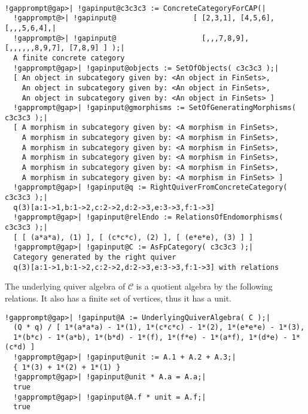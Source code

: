 \begin{computation}\phantom{}\\
\begin{Verbatim}[commandchars=!@|,fontsize=\small,frame=single,label=Example]
  !gapprompt@gap>| !gapinput@c3c3c3 := ConcreteCategoryForCAP(|
  !gapprompt@>| !gapinput@                  [ [2,3,1], [4,5,6], [,,,5,6,4],|
  !gapprompt@>| !gapinput@                    [,,,7,8,9], [,,,,,,8,9,7], [7,8,9] ] );|
  A finite concrete category
  !gapprompt@gap>| !gapinput@objects := SetOfObjects( c3c3c3 );|
  [ An object in subcategory given by: <An object in FinSets>,
    An object in subcategory given by: <An object in FinSets>,
    An object in subcategory given by: <An object in FinSets> ]
  !gapprompt@gap>| !gapinput@gmorphisms := SetOfGeneratingMorphisms( c3c3c3 );|
  [ A morphism in subcategory given by: <A morphism in FinSets>,
    A morphism in subcategory given by: <A morphism in FinSets>,
    A morphism in subcategory given by: <A morphism in FinSets>,
    A morphism in subcategory given by: <A morphism in FinSets>,
    A morphism in subcategory given by: <A morphism in FinSets>,
    A morphism in subcategory given by: <A morphism in FinSets> ]
  !gapprompt@gap>| !gapinput@q := RightQuiverFromConcreteCategory( c3c3c3 );|
  q(3)[a:1->1,b:1->2,c:2->2,d:2->3,e:3->3,f:1->3]
  !gapprompt@gap>| !gapinput@relEndo := RelationsOfEndomorphisms( c3c3c3 );|
  [ [ (a*a*a), (1) ], [ (c*c*c), (2) ], [ (e*e*e), (3) ] ]
  !gapprompt@gap>| !gapinput@C := AsFpCategory( c3c3c3 );|
  Category generated by the right quiver
  q(3)[a:1->1,b:1->2,c:2->2,d:2->3,e:3->3,f:1->3] with relations
\end{Verbatim}
The underlying quiver algebra of $\mathcal{C}$ is a quotient algebra by the following relations. It also has a finite
set of vertices, thus it has a unit.
\begin{Verbatim}[commandchars=!@|,fontsize=\small,frame=single,label=Example]
  !gapprompt@gap>| !gapinput@A := UnderlyingQuiverAlgebra( C );|
  (Q * q) / [ 1*(a*a*a) - 1*(1), 1*(c*c*c) - 1*(2), 1*(e*e*e) - 1*(3),
  1*(b*c) - 1*(a*b), 1*(b*d) - 1*(f), 1*(f*e) - 1*(a*f), 1*(d*e) - 1*(c*d) ]
  !gapprompt@gap>| !gapinput@unit := A.1 + A.2 + A.3;|
  { 1*(3) + 1*(2) + 1*(1) }
  !gapprompt@gap>| !gapinput@unit * A.a = A.a;|
  true
  !gapprompt@gap>| !gapinput@A.f * unit = A.f;|
  true
\end{Verbatim}


\end{computation}
